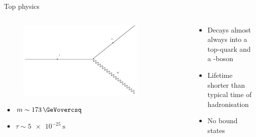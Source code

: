\begin{frame}{Top physics}
    \begin{columns}
        \begin{column}{0.5\textwidth}
        \begin{figure}
            \centering
            \includegraphics[width=0.8\textwidth]{figures_theory/t_decay.pdf}
        \end{figure}
        \begin{itemize}
            \item $ m \sim \SI{173}{\GeVovercsq}$
            \vspace{0.2cm}
            \item $\tau \sim \SI{5e-25}{\second}$
        \end{itemize}
        \end{column}
        \begin{column}{0.5\textwidth}
        \begin{itemize}
            \item Decays almost always into a top-quark and a \PW-boson
            \vspace{0.2cm}
            \item Lifetime shorter than typical time of hadronisation 
            \vspace{0.2cm}
            \item No bound states
        \end{itemize}
        \end{column}
    \end{columns}
\end{frame}


